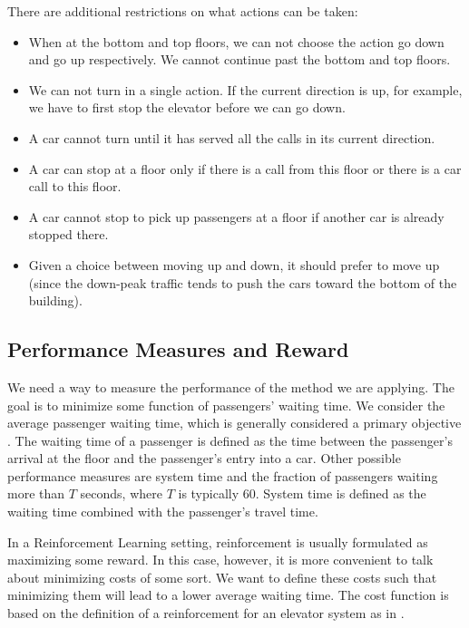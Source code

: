 There are additional restrictions on what actions can be taken:

\begin{itemize}
    \item When at the bottom and top floors, we can not choose the action go down and go up respectively. We cannot continue past the bottom and top floors.
    \item We can not turn in a single action. If the current direction is up, for example, we have to first stop the elevator before we can go down.
    \item A car cannot turn until it has served all the calls in its current direction.
    \item A car can stop at a floor only if there is a call from this floor or there
    is a car call to this floor.
    \item A car cannot stop to pick up passengers at a floor if another car is already stopped there.
    \item Given a choice between moving up and down, it should prefer to move up (since
    the down-peak traffic tends to push the cars toward the bottom of the building).
\end{itemize}

\subsection{Performance Measures and Reward}

We need a way to measure the performance of the method we are applying. The goal is to minimize some function of passengers' waiting time. We consider the average passenger waiting time, which is generally considered a primary objective \cite{elevator_dynamics}. The waiting time of a passenger is defined as the time between the passenger's arrival at the floor and the passenger's entry into a car. Other possible performance measures are system time and the fraction of passengers waiting more than $T$ seconds, where $T$ is typically 60. System time is defined as the waiting time combined with the passenger's travel time.

In a Reinforcement Learning setting, reinforcement is usually formulated as maximizing some reward. In this case, however, it is more convenient to talk about minimizing costs of some sort. We want to define these costs such that minimizing them will lead to a lower average waiting time. The cost function is based on the definition of a reinforcement for an elevator system as in \cite{crites_barto_group_1998, crites_barto_1998}.

